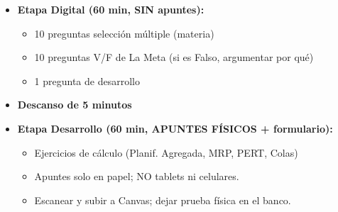 \documentclass[11pt, a4paper]{article}
\begin{document}
\begin{titlepage}
  \vspace{0.5cm}

  \begin{estructuraprueba}
    \begin{itemize}[leftmargin=1.2em, itemsep=3pt]
      \item \textbf{Etapa Digital (60 min, SIN apuntes):}
        \begin{itemize}[leftmargin=1.2em, itemsep=1pt]
          \item 10 preguntas selección múltiple (materia)
          \item 10 preguntas V/F de La Meta (si es Falso, argumentar por qué)
          \item 1 pregunta de desarrollo
        \end{itemize}
      \item \textbf{Descanso de 5 minutos}
      \item \textbf{Etapa Desarrollo (60 min, APUNTES FÍSICOS + formulario):}
        \begin{itemize}[leftmargin=1.2em, itemsep=1pt]
          \item Ejercicios de cálculo (Planif. Agregada, MRP, PERT, Colas)
          \item Apuntes solo en papel; NO tablets ni celulares.
          \item Escanear y subir a Canvas; dejar prueba física en el banco.
        \end{itemize}
    \end{itemize}
  \end{estructuraprueba}

  \vfill
\end{titlepage}
\newpage

\end{document}
